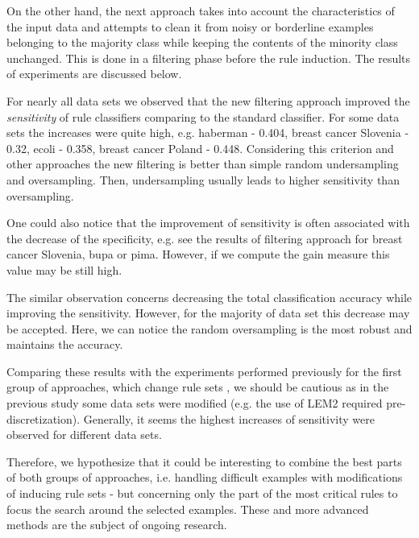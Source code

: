 \documentclass{AIMeth05}
\begin{document}
On the other hand, the next approach takes into account the characteristics
of the input data and attempts to clean it from noisy or borderline examples
belonging to the majority class while keeping the contents of the minority
class unchanged. This is done in a filtering phase before the rule
induction. The results of experiments are discussed below.

For nearly all data sets we observed that the new filtering approach
improved the {\em sensitivity} of rule classifiers comparing to the standard
classifier. For some data sets the increases were quite high, e.g. haberman
- 0.404, breast cancer Slovenia - 0.32, ecoli - 0.358, breast cancer Poland
- 0.448. Considering this criterion and other approaches the new filtering
is better than simple random undersampling and oversampling. Then, 
undersampling usually leads to higher sensitivity than oversampling.

One could also notice that the improvement of sensitivity is often
associated with the decrease of the specificity, e.g. see the results of
filtering approach for breast cancer Slovenia, bupa or pima. However, if we
compute the gain measure this value may be still high.

The similar observation concerns decreasing the total classification
accuracy while improving the sensitivity. However, for the majority of data
set this decrease may be accepted. Here, we can notice the random
oversampling is the most robust and maintains the accuracy.

Comparing these results with the experiments performed previously for the
first group of approaches, which change rule sets \cite{GrzymJSW}, we should
be cautious as in the previous study some data sets were modified (e.g. the
use of LEM2 required pre-discretization). Generally,  it seems the highest
increases of sensitivity were observed for different data sets.

Therefore, we hypothesize that it could be interesting to combine the best
parts of both groups of approaches, i.e. handling difficult examples with
modifications of inducing rule sets - but concerning only the part of the
most critical rules to focus the search around the selected examples. These
and more advanced methods are the subject of ongoing research.
%
\end{document}
